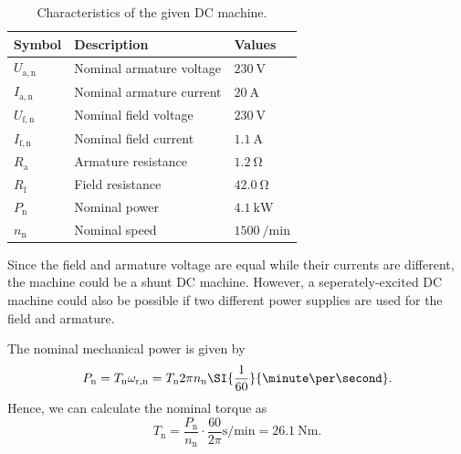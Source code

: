 \begin{table}[htb]
    \caption{Characteristics of the given DC machine.}
    \centering
    \begin{tabular}{lll}\toprule
    Symbol  & Description       & Values \\
    \midrule
    $U_{\mathrm{a,n}}$    & Nominal armature voltage           & $\SI{230}{\volt}$ \\
    $I_{\mathrm{a,n}}$    & Nominal armature current           & $\SI{20}{\ampere}$ \\
    $U_{\mathrm{f,n}}$    & Nominal field voltage           & $\SI{230}{\volt}$ \\
    $I_{\mathrm{f,n}}$    & Nominal field current           & $\SI{1.1}{\ampere}$ \\
    $R_{\mathrm{a}}$    & Armature resistance           & $\SI{1.2}{\ohm}$ \\
    $R_{\mathrm{f}}$    & Field resistance           & $\SI{42.0}{\ohm}$ \\
    $P_{\mathrm{n}}$    & Nominal power             & $\SI{4.1}{\kilo\watt}$ \\
    $n_{\mathrm{n}}$    & Nominal speed             & $\SI{1500}{\per\minute}$\\ 
    \bottomrule
    \end{tabular}
    \label{tab:characteristicsDC_task2}
\end{table}

\begin{solutionblock}
    Since the field and armature voltage are equal while their currents are different, the machine could be a shunt DC machine. However, a seperately-excited DC machine could also be possible if two different power supplies are used for the field and armature. 
\end{solutionblock}


\begin{solutionblock}
    The nominal mechanical power is given by
    $$ P_{\mathrm{n}} = T_{\mathrm{n}} \omega_{\mathrm{r,n}}=T_{\mathrm{n}} 2\pi n_{\mathrm{n}} \SI{\frac{1}{60}}{\minute\per\second}.$$
    Hence, we can calculate the nominal torque as
    $$ T_{\mathrm{n}} = \frac{P_{\mathrm{n}}}{n_{\mathrm{n}}} \cdot\frac{ 60}{2\pi } \si{\second\per\minute}= \SI{26.1}{\newton\meter}.$$
\end{solutionblock}

